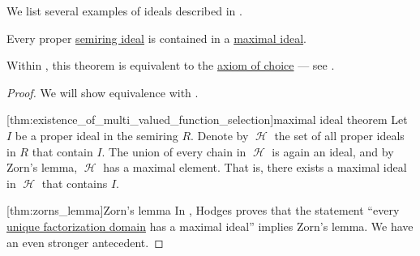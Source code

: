 \begin{example}\label{ex:def:derived_semiring_ideals}
  We list several examples of ideals described in .
\end{example}

\begin{theorem}\label{thm:maximal_ideal_theorem}
  Every proper \hyperref[def:semiring_ideal]{semiring ideal} is contained in a \hyperref[def:derived_semiring_ideals/maximal]{maximal ideal}.

  Within \hyperref[def:zfc]{}, this theorem is equivalent to the \hyperref[def:zfc/choice]{axiom of choice} --- see .
\end{theorem}
\begin{proof}
  We will show equivalence with .

  [thm:existence_of_multi_valued_function_selection]{maximal ideal theorem} Let \( I \) be a proper ideal in the semiring \( R \). Denote by \( \mscrH \) the set of all proper ideals in \( R \) that contain \( I \). The union of every chain in \( \mscrH \) is again an ideal, and by Zorn's lemma, \( \mscrH \) has a maximal element. That is, there exists a maximal ideal in \( \mscrH \) that contains \( I \).

  [thm:zorns_lemma]{Zorn's lemma} In \cite{Hodges1979}, Hodges proves that the statement \enquote{every \hyperref[def:unique_factorization_domain]{unique factorization domain} has a maximal ideal} implies Zorn's lemma. We have an even stronger antecedent.
\end{proof}
